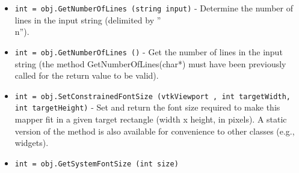 \begin{itemize}
\item  \verb|int = obj.GetNumberOfLines (string input)| -  Determine the number of lines in the input string (delimited by ''\\n'').

\item  \verb|int = obj.GetNumberOfLines ()| -  Get the number of lines in the input string (the method GetNumberOfLines(char*)
 must have been previously called for the return value to be valid).

\item  \verb|int = obj.SetConstrainedFontSize (vtkViewport , int targetWidth, int targetHeight)| -  Set and return the font size required to make this mapper fit in a given 
 target rectangle (width x height, in pixels). A static version of the method
 is also available for convenience to other classes (e.g., widgets).  

\item  \verb|int = obj.GetSystemFontSize (int size)|

\end{itemize}
